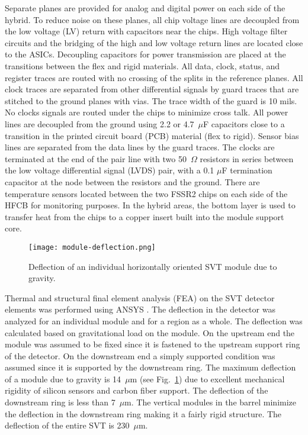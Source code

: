 Separate planes are provided for analog and digital power on each side of the hybrid. To reduce noise on these planes, all chip voltage lines are decoupled from the low voltage (LV) return with capacitors near the chips. High voltage filter circuits and the bridging of the high and low voltage return lines are located close to the ASICs. Decoupling capacitors for power transmission are placed at the transitions between the flex and rigid materials. All data, clock, status, and register traces are routed with no crossing of the splits in the reference planes. All clock traces are separated from other differential signals by guard traces that are stitched to the ground planes with vias. The trace width of the guard is 10 mils. No clocks signals are routed under the chips to minimize cross talk. All power lines are  decoupled from the ground using 2.2 or 4.7~$\mu$F capacitors close to a transition in the printed circuit board (PCB) material (flex to rigid). Sensor bias lines are separated from the data lines by the guard traces. The clocks are terminated at the end of the pair line with two 50~$\Omega$ resistors in series between the low voltage differential signal (LVDS) pair, with a 0.1 $\mu$F termination capacitor at the node between the resistors and the ground. There are temperature sensors located between the two FSSR2 chips on each side of the HFCB for monitoring purposes. In the hybrid areas, the bottom layer is used to transfer heat from the chips to a copper insert built into the module support core.

\begin{figure}[hbt] 
\centering 
\texttt{[image: module-deflection.png]}
\caption{Deflection of an individual horizontally oriented SVT module due to gravity.}
\label{fig:module-deflection}
\end{figure}

Thermal and structural final element analysis (FEA) on the SVT detector elements was performed using ANSYS \cite{ANSYS}. The deflection in the detector was analyzed for an individual module and for a region as a whole. The deflection was calculated based on gravitational load on the module. On the upstream end the module was assumed to be fixed since it is fastened to the upstream support ring of the detector. On the downstream end a simply supported condition was assumed since it is supported by the downstream ring. The maximum deflection of a module due to gravity is 14~$\mu$m (see Fig.~\ref{fig:module-deflection}) due to excellent mechanical rigidity of silicon sensors and carbon fiber support. The deflection of the downstream ring is less than 7~$\mu$m. The vertical modules in the barrel minimize the deflection in the downstream ring making it a fairly rigid structure. The deflection of the entire SVT is 230~$\mu$m. 

